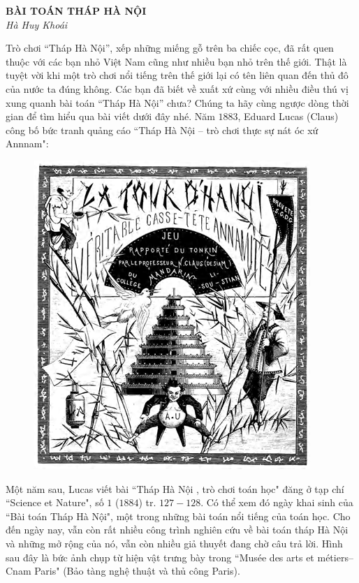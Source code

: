 \graphicspath{{../timhieulichsu/pic/}}

	\begin{center}
		\textbf{\color{toancuabi}\Large\color{toancuabi}BÀI TOÁN THÁP HÀ NỘI}\\
		\textit{Hà Huy Khoái}
	\end{center}
	Trò chơi “Tháp Hà Nội”, xếp những miếng gỗ trên ba chiếc cọc, đã rất quen thuộc với các bạn nhỏ Việt Nam cũng như nhiều bạn nhỏ trên thế giới. Thật là tuyệt vời khi một trò chơi nổi tiếng trên thế giới lại có tên liên quan đến thủ đô của nước ta đúng không. Các bạn đã biết về xuất xứ cùng với nhiều điều thú vị xung quanh bài toán “Tháp Hà Nội” chưa? Chúng ta hãy cùng ngược dòng thời gian để tìm hiểu qua bài viết dưới đây nhé.
	\vskip 0.1cm
	Năm $1883$, Eduard Lucas (Claus) công bố  bức tranh quảng cáo ``Tháp Hà Nội --  trò chơi thực sự nát óc xứ Annnam":
	\begin{figure}[H]
		\centering
		\vspace*{-5pt}
		\captionsetup{labelformat= empty, justification=centering}
		\includegraphics[width=0.4\linewidth]{1.1}
		\vspace*{-10pt}
	\end{figure}
	Một năm sau, Lucas viết bài ``Tháp Hà Nội , trò chơi toán học" đăng ở tạp chí ``Science et Nature", số $1$ ($1884$) tr. $127-128$. Có thể xem đó ngày khai sinh của ``Bài toán Tháp Hà Nội", một trong những bài toán nổi tiếng của toán học. Cho đến ngày nay, vẫn còn rất nhiều công trình nghiên cứu về bài toán tháp Hà Nội và những mở rộng của nó, vẫn còn nhiều giả thuyết đang chờ câu trả lời.
	\vskip 0.1cm
	Hình sau đây là bức ảnh chụp từ hiện vật trưng bày trong ``Musée des arts et métiers--Cnam Paris" (Bảo tàng nghệ thuật và thủ công Paris). 
